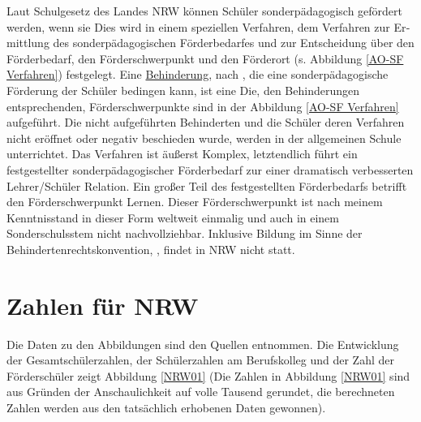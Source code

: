 Laut Schulgesetz des Landes NRW können Schüler sonder­päda­go­gisch gefördert werden, wenn sie
Dies wird in einem speziellen Verfahren, dem Verfahren zur Er­mitt­lung des sonder­päda­go­gi­schen Förder­bedarfes und zur Entscheidung über den Förder­bedarf, den Förderschwerpunkt und den Förderort (s. Abbildung \ref{AO-SF Verfahren}) festgelegt. Eine \hyperlink{Behi}{Behinderung}, nach \citep{AOSF:05}, die eine sonder­pädagogische Förderung der Schüler bedingen kann, ist eine
Die, den Behinderungen entsprechenden, Förder­schwerpunkte sind in der Abbildung \ref{AO-SF Verfahren} aufge­führt. Die nicht aufgeführten Behinderten und die Schüler deren Verfahren nicht eröffnet oder negativ beschieden wurde, werden in der allgemeinen Schule unterrichtet.
Das Verfahren ist äußerst Komplex, letztendlich führt ein festgestellter sonderpädagogischer Förderbedarf zur einer dramatisch verbesserten Lehrer/Schüler Relation. Ein großer Teil des festgestellten Förderbedarfs betrifft den Förderschwerpunkt Lernen. Dieser Förderschwerpunkt ist nach meinem Kenntnisstand in dieser Form weltweit einmalig und auch in einem Sonderschulsstem nicht nachvollziehbar. 
Inklusive Bildung im Sinne der Behindertenrechtskonvention, \cite{UNCo:06}, findet in NRW nicht statt.
\section{Zahlen für NRW}
Die Daten zu den Abbildungen sind den Quellen \citeyear{MSW:01, MSW:02, MSW:03, MSW:04, MSW:05, MSW:06, MSW:07, MSW:08, MSW:09, MSW:10}
entnommen. Die Entwicklung der Gesamtschülerzahlen, der Schülerzahlen am Berufskolleg und der Zahl der Förderschüler zeigt Abbildung \ref{NRW01} (Die Zahlen in Abbildung \ref{NRW01} sind aus Gründen der Anschaulichkeit auf volle Tausend gerundet, die berechneten Zahlen werden aus den tatsächlich erhobenen Daten gewonnen).

